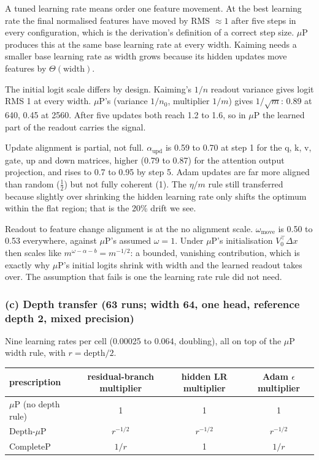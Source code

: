 \documentclass[10pt,letterpaper]{article}
\newcommand{\muP}{$\mu$P}
\begin{document}
A tuned learning rate means order one feature movement. At the best learning rate the final normalised features have moved by RMS $\approx1$ after five steps in every configuration, which is the derivation's definition of a correct step size. \muP{} produces this at the same base learning rate at every width. Kaiming needs a smaller base learning rate as width grows because its hidden updates move features by $\Theta(\text{width})$.

The initial logit scale differs by design. Kaiming's $1/n$ readout variance gives logit RMS 1 at every width. \muP's (variance $1/n_0$, multiplier $1/m$) gives $1/\sqrt m$: 0.89 at 640, 0.45 at 2560. After five updates both reach 1.2 to 1.6, so in \muP{} the learned part of the readout carries the signal.

Update alignment is partial, not full. $\alpha_{\mathrm{upd}}$ is 0.59 to 0.70 at step 1 for the q, k, v, gate, up and down matrices, higher (0.79 to 0.87) for the attention output projection, and rises to 0.7 to 0.95 by step 5. Adam updates are far more aligned than random ($\tfrac12$) but not fully coherent (1). The $\eta/m$ rule still transferred because slightly over shrinking the hidden learning rate only shifts the optimum within the flat region; that is the 20\% drift we see.

Readout to feature change alignment is at the no alignment scale. $\omega_{\mathrm{move}}$ is 0.50 to 0.53 everywhere, against \muP's assumed $\omega=1$. Under \muP's initialisation $V_0^\top\Delta x$ then scales like $m^{\omega-\alpha-b}=m^{-1/2}$: a bounded, vanishing contribution, which is exactly why \muP's initial logits shrink with width and the learned readout takes over. The assumption that fails is one the learning rate rule did not need.

\subsubsection*{(c) Depth transfer (63 runs; width 64, one head, reference depth 2, mixed precision)}

Nine learning rates per cell (0.00025 to 0.064, doubling), all on top of the \muP{} width rule, with $r=\text{depth}/2$.

\begin{table}[H]\centering\small
\begin{tabular}{lccc}\toprule
prescription & residual-branch multiplier & hidden LR multiplier & Adam $\epsilon$ multiplier\\\midrule
\muP{} (no depth rule) & 1 & 1 & 1\\
Depth-\muP & $r^{-1/2}$ & $r^{-1/2}$ & $r^{-1/2}$\\
CompleteP & $1/r$ & 1 & $1/r$\\\bottomrule
\end{tabular}
\end{table}
\end{document}
